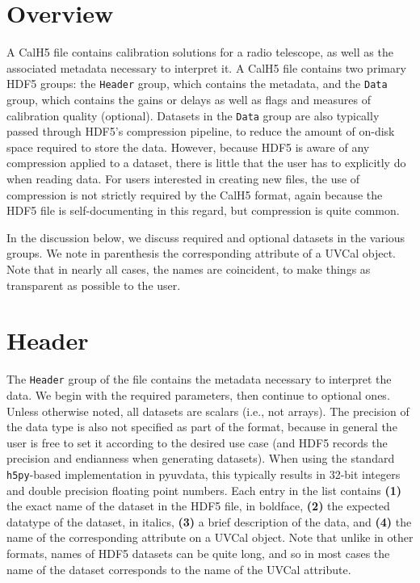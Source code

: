\documentclass[11pt, oneside]{article}
\begin{document}
\section{Overview}
\label{sec:overview}
A CalH5 file contains calibration solutions for a radio telescope, as well
as the associated metadata necessary to interpret it. A CalH5 file contains two
primary HDF5 groups: the \texttt{Header} group, which contains the metadata, and
the \texttt{Data} group, which contains the gains or delays as well as flags and
measures of calibration quality (optional). Datasets in the \texttt{Data} group are
also typically passed through HDF5's compression pipeline, to reduce the amount
of on-disk space required to store the data. However, because HDF5 is aware of
any compression applied to a dataset, there is little that the user has to explicitly
do when reading data. For users interested in creating new files, the use of
compression is not strictly required by the CalH5 format, again because the
HDF5 file is self-documenting in this regard, but compression is quite common.

In the discussion below, we discuss required and optional datasets in the
various groups. We note in parenthesis the corresponding attribute of a UVCal
object. Note that in nearly all cases, the names are coincident, to make things
as transparent as possible to the user.

\section{Header}
\label{sec:header}
The \texttt{Header} group of the file contains the metadata necessary to interpret
the data. We begin with the required parameters, then continue to optional
ones. Unless otherwise noted, all datasets are scalars (i.e., not arrays). The
precision of the data type is also not specified as part of the format, because
in general the user is free to set it according to the desired use case (and
HDF5 records the precision and endianness when generating datasets). When using
the standard \texttt{h5py}-based implementation in pyuvdata, this typically
results in 32-bit integers and double precision floating point numbers. Each
entry in the list contains \textbf{(1)} the exact name of the dataset in the
HDF5 file, in boldface, \textbf{(2)} the expected datatype of the dataset, in
italics, \textbf{(3)} a brief description of the data, and \textbf{(4)} the name
of the corresponding attribute on a UVCal object. Note that unlike in other
formats, names of HDF5 datasets can be quite long, and so in most cases the name
of the dataset corresponds to the name of the UVCal attribute.
\end{document}
